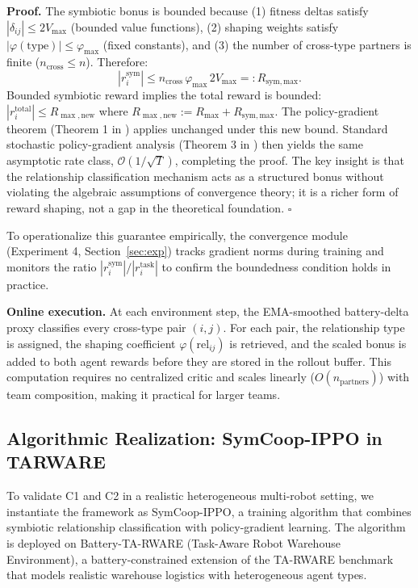 \documentclass[Afour,sageh,times]{sagej}
\begin{document}
\textbf{Proof.}
The symbiotic bonus is bounded because (1) fitness deltas satisfy $|\delta_{ij}| \le 2V_{\max}$ (bounded value functions), (2) shaping weights satisfy $|\varphi(\mathrm{type})| \le \varphi_{\max}$ (fixed constants), and (3) the number of cross-type partners is finite ($n_{\mathrm{cross}} \le n$). Therefore:
\begin{equation}
|r_i^{\mathrm{sym}}| \le n_{\mathrm{cross}}\,\varphi_{\max}\,2V_{\max} =: R_{\mathrm{sym,max}}.
\end{equation}
Bounded symbiotic reward implies the total reward is bounded: $|r_i^{\mathrm{total}}| \le R_{\max,\mathrm{new}}$ where $R_{\max,\mathrm{new}} := R_{\max} + R_{\mathrm{sym,max}}$. The policy-gradient theorem (Theorem 1 in \citet{sutton1999Policy}) applies unchanged under this new bound. Standard stochastic policy-gradient analysis (Theorem 3 in \citet{sutton1999Policy}) then yields the same asymptotic rate class, $\mathcal{O}(1/\sqrt{T})$, completing the proof. The key insight is that the relationship classification mechanism acts as a structured bonus without violating the algebraic assumptions of convergence theory; it is a richer form of reward shaping, not a gap in the theoretical foundation. $\square$

To operationalize this guarantee empirically, the convergence module (Experiment 4, Section~\ref{sec:exp}) tracks gradient norms during training and monitors the ratio $|r_i^{\mathrm{sym}}| / |r_i^{\mathrm{task}}|$ to confirm the boundedness condition holds in practice.

\textbf{Online execution.}
At each environment step, the EMA-smoothed battery-delta proxy classifies every cross-type pair $(i,j)$. For each pair, the relationship type is assigned, the shaping coefficient $\varphi(\mathrm{rel}_{ij})$ is retrieved, and the scaled bonus is added to both agent rewards before they are stored in the rollout buffer. This computation requires no centralized critic and scales linearly ($O(n_{\mathrm{partners}})$) with team composition, making it practical for larger teams.

\subsection{Algorithmic Realization: SymCoop-IPPO in TARWARE}
\label{sec:training}

To validate C1 and C2 in a realistic heterogeneous multi-robot setting, we instantiate the framework as SymCoop-IPPO, a training algorithm that combines symbiotic relationship classification with policy-gradient learning. The algorithm is deployed on Battery-TA-RWARE (Task-Aware Robot Warehouse Environment), a battery-constrained extension of the TA-RWARE benchmark that models realistic warehouse logistics with heterogeneous agent types.
\end{document}
